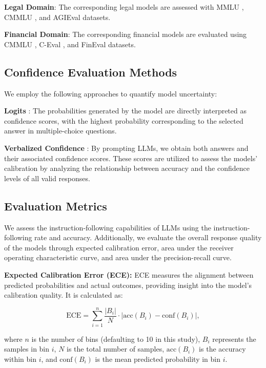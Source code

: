 \textbf{Legal Domain}: The corresponding legal models are assessed with MMLU \citep{hendrycks2021measuring}, CMMLU \citep{li2023cmmlu}, and AGIEval \citep{zhong2023agieval} datasets.

\textbf{Financial Domain}: The corresponding financial models are evaluated using CMMLU \citep{li2023cmmlu}, C-Eval \citep{huang2024c}, and FinEval \citep{zhang2023fineval} datasets.

 
\subsection{Confidence Evaluation Methods}

We employ the following approaches to quantify model uncertainty:

\noindent\textbf{Logits} \citep{yang2023improving}: The probabilities generated by the model are directly interpreted as confidence scores, with the highest probability corresponding to the selected answer in multiple-choice questions.

\noindent\textbf{Verbalized Confidence} \citep{lin2022teaching}: By prompting LLMs, we obtain both answers and their associated confidence scores. These scores are utilized to assess the models' calibration by analyzing the relationship between accuracy and the confidence levels of all valid responses.





\subsection{Evaluation Metrics}

We assess the instruction-following capabilities of LLMs using the instruction-following rate and accuracy. Additionally, we evaluate the overall response quality of the models through expected calibration error, area under the receiver operating characteristic curve, and area under the precision-recall curve.

\textbf{Expected Calibration Error (ECE):} ECE measures the alignment between predicted probabilities and actual outcomes, providing insight into the model's calibration quality. It is calculated as:

\begin{equation}
\text{ECE} = \sum_{i=1}^{n} \frac{|B_i|}{N} \cdot \left| \text{acc}(B_i) - \text{conf}(B_i) \right|,
\end{equation}

where \( n \) is the number of bins (defaulting to 10 in this study), \( B_i \) represents the samples in bin \( i \), \( N \) is the total number of samples, \( \text{acc}(B_i) \) is the accuracy within bin \( i \), and \( \text{conf}(B_i) \) is the mean predicted probability in bin \( i \).

